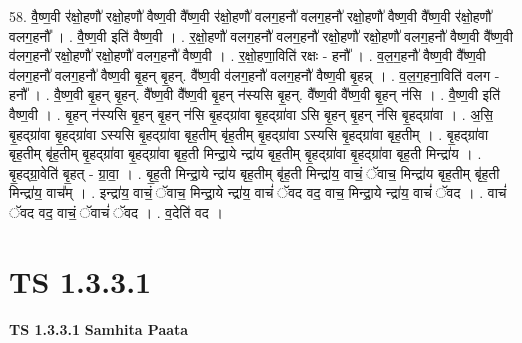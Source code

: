 \documentclass[17pt]{extarticle}
\begin{document}
58. वै॒ष्ण॒वी र॑क्षो॒हणौ॑ रक्षो॒हणौ॑ वैष्ण॒वी वै᳚ष्ण॒वी र॑क्षो॒हणौ॑ वलग॒हनौ॑ वलग॒हनौ॑ रक्षो॒हणौ॑ वैष्ण॒वी वै᳚ष्ण॒वी र॑क्षो॒हणौ॑ वलग॒हनौ᳚ । . वै॒ष्ण॒वी इति॑ वैष्ण॒वी । . र॒क्षो॒हणौ॑ वलग॒हनौ॑ वलग॒हनौ॑ रक्षो॒हणौ॑ रक्षो॒हणौ॑ वलग॒हनौ॑ वैष्ण॒वी वै᳚ष्ण॒वी व॑लग॒हनौ॑ रक्षो॒हणौ॑ रक्षो॒हणौ॑ वलग॒हनौ॑ वैष्ण॒वी । . र॒क्षो॒हणा॒विति॑ रक्षः - हनौ᳚ । . व॒ल॒ग॒हनौ॑ वैष्ण॒वी वै᳚ष्ण॒वी व॑लग॒हनौ॑ वलग॒हनौ॑ वैष्ण॒वी बृ॒हन् बृ॒हन्. वै᳚ष्ण॒वी व॑लग॒हनौ॑ वलग॒हनौ॑ वैष्ण॒वी बृ॒हन्न् । . व॒ल॒ग॒हना॒विति॑ वलग - हनौ᳚ । . वै॒ष्ण॒वी बृ॒हन् बृ॒हन्. वै᳚ष्ण॒वी वै᳚ष्ण॒वी बृ॒हन् न॑स्यसि बृ॒हन्. वै᳚ष्ण॒वी वै᳚ष्ण॒वी बृ॒हन् न॑सि । . वै॒ष्ण॒वी इति॑ वैष्ण॒वी । . बृ॒हन् न॑स्यसि बृ॒हन् बृ॒हन् न॑सि बृ॒हद्ग्रा॑वा बृ॒हद्ग्रा॑वा ऽसि बृ॒हन् बृ॒हन् न॑सि बृ॒हद्ग्रा॑वा । . अ॒सि॒ बृ॒हद्ग्रा॑वा बृ॒हद्ग्रा॑वा ऽस्यसि बृ॒हद्ग्रा॑वा बृह॒तीम् बृ॑ह॒तीम् बृ॒हद्ग्रा॑वा ऽस्यसि बृ॒हद्ग्रा॑वा बृह॒तीम् । . बृ॒हद्ग्रा॑वा बृह॒तीम् बृ॑ह॒तीम् बृ॒हद्ग्रा॑वा बृ॒हद्ग्रा॑वा बृह॒ती मिन्द्रा॒ये न्द्रा॑य बृह॒तीम् बृ॒हद्ग्रा॑वा बृ॒हद्ग्रा॑वा बृह॒ती मिन्द्रा॑य । . बृ॒हद्ग्रा॒वेति॑ बृ॒हत् - ग्रा॒वा॒ । . बृ॒ह॒ती मिन्द्रा॒ये न्द्रा॑य बृह॒तीम् बृ॑ह॒ती मिन्द्रा॑य॒ वाचं॒ ॅवाच॒ मिन्द्रा॑य बृह॒तीम् बृ॑ह॒ती मिन्द्रा॑य॒ वाच᳚म् । . इन्द्रा॑य॒ वाचं॒ ॅवाच॒ मिन्द्रा॒ये न्द्रा॑य॒ वाचं॑ ॅवद वद॒ वाच॒ मिन्द्रा॒ये न्द्रा॑य॒ वाचं॑ ॅवद । . वाचं॑ ॅवद वद॒ वाचं॒ ॅवाचं॑ ॅवद । . व॒देति॑ वद । \newline
\pagebreak
{}

\section{ TS 1.3.3.1 }

\textbf{TS 1.3.3.1 } \newline
\textbf{Samhita Paata} \newline
\end{document}
